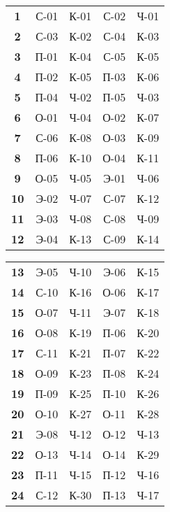 \documentclass[12pt]{article}
\begin{document}
\begin{multicols}{3}

\begin{tabular}{c|rrrr}
\textbf{1}  & {С-01} & {К-01} & {С-02} & {Ч-01} \\
\textbf{2}  & {С-03} & {К-02} & {С-04} & {К-03} \\
\textbf{3}  & {П-01} & {К-04} & {С-05} & {К-05} \\
\textbf{4}  & {П-02} & {К-05} & {П-03} & {К-06} \\
\textbf{5}  & {П-04} & {Ч-02} & {П-05} & {Ч-03} \\
\textbf{6}  & {О-01} & {Ч-04} & {О-02} & {К-07} \\
\textbf{7}  & {С-06} & {К-08} & {О-03} & {К-09} \\
\textbf{8}  & {П-06} & {К-10} & {О-04} & {К-11} \\
\textbf{9}  & {О-05} & {Ч-05} & {Э-01} & {Ч-06} \\
\textbf{10} & {Э-02} & {Ч-07} & {С-07} & {К-12} \\
\textbf{11} & {Э-03} & {Ч-08} & {С-08} & {Ч-09} \\
\textbf{12} & {Э-04} & {К-13} & {С-09} & {К-14} \\
\end{tabular}

\begin{tabular}{c|rrrr}
\textbf{13} & {Э-05} & {Ч-10} & {Э-06} & {К-15} \\
\textbf{14} & {С-10} & {К-16} & {О-06} & {К-17} \\
\textbf{15} & {О-07} & {Ч-11} & {Э-07} & {К-18} \\
\textbf{16} & {О-08} & {К-19} & {П-06} & {К-20} \\
\textbf{17} & {С-11} & {К-21} & {П-07} & {К-22} \\
\textbf{18} & {О-09} & {К-23} & {П-08} & {К-24} \\
\textbf{19} & {П-09} & {К-25} & {П-10} & {К-26} \\
\textbf{20} & {О-10} & {К-27} & {О-11} & {К-28} \\
\textbf{21} & {Э-08} & {Ч-12} & {О-12} & {Ч-13} \\
\textbf{22} & {О-13} & {Ч-14} & {О-14} & {К-29} \\
\textbf{23} & {П-11} & {Ч-15} & {П-12} & {Ч-16} \\
\textbf{24} & {С-12} & {К-30} & {П-13} & {Ч-17} \\
\end{tabular}


\end{multicols}
\end{document}
